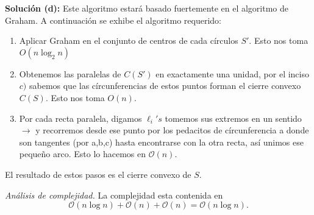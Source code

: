 \textbf{Solución (d):}
Este algoritmo estará basado fuertemente en el algoritmo de Graham. A continuación
se exhibe el algoritmo requerido:
 \begin{enumerate}
     \item Aplicar Graham en el conjunto de centros de cada círculos $S'$. Esto nos
     toma $O(n \log_2 n)$
     \item Obtenemos las paralelas de $C(S')$ en exactamente una unidad, por el
     inciso  $c)$ sabemos que las círcunferencias de estos puntos forman el cierre
     convexo $C(S)$. Esto nos toma $O(n)$.
     \item Por cada recta paralela, digamos $\ell_{i} 's$ tomemos sus extremos en un
       sentido $\rightarrow$ y recorremos desde ese punto por los pedacitos de círcunferencia
       a donde son tangentes (por a,b,c) hasta encontrarse con la otra recta, así unimos ese
       pequeño arco. Esto lo hacemos en $\mathcal{O}(n)$.
 \end{enumerate}

El resultado de estos pasos es el cierre convexo de $S$.\newline

\textit{Análisis de complejidad.} La complejidad esta contenida en
\[
\mathcal{O}(n \log n) + \mathcal{O}(n) + \mathcal{O}(n) = \mathcal{O}(n \log n).
\]
